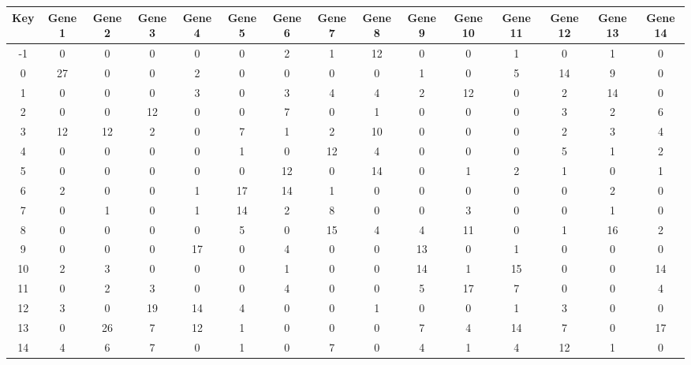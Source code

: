 \begin{tabular}{|c|c|c|c|c|c|c|c|c|c|c|c|c|c|c|}
\hline
Key & Gene 1 & Gene 2 & Gene 3 & Gene 4 & Gene 5 & Gene 6 & Gene 7 & Gene 8 & Gene 9 & Gene 10 & Gene 11 & Gene 12 & Gene 13 & Gene 14 \\
\hline
-1 & 0 & 0 & 0 & 0 & 0 & 2 & 1 & 12 & 0 & 0 & 1 & 0 & 1 & 0 \\
0 & 27 & 0 & 0 & 2 & 0 & 0 & 0 & 0 & 1 & 0 & 5 & 14 & 9 & 0 \\
1 & 0 & 0 & 0 & 3 & 0 & 3 & 4 & 4 & 2 & 12 & 0 & 2 & 14 & 0 \\
2 & 0 & 0 & 12 & 0 & 0 & 7 & 0 & 1 & 0 & 0 & 0 & 3 & 2 & 6 \\
3 & 12 & 12 & 2 & 0 & 7 & 1 & 2 & 10 & 0 & 0 & 0 & 2 & 3 & 4 \\
4 & 0 & 0 & 0 & 0 & 1 & 0 & 12 & 4 & 0 & 0 & 0 & 5 & 1 & 2 \\
5 & 0 & 0 & 0 & 0 & 0 & 12 & 0 & 14 & 0 & 1 & 2 & 1 & 0 & 1 \\
6 & 2 & 0 & 0 & 1 & 17 & 14 & 1 & 0 & 0 & 0 & 0 & 0 & 2 & 0 \\
7 & 0 & 1 & 0 & 1 & 14 & 2 & 8 & 0 & 0 & 3 & 0 & 0 & 1 & 0 \\
8 & 0 & 0 & 0 & 0 & 5 & 0 & 15 & 4 & 4 & 11 & 0 & 1 & 16 & 2 \\
9 & 0 & 0 & 0 & 17 & 0 & 4 & 0 & 0 & 13 & 0 & 1 & 0 & 0 & 0 \\
10 & 2 & 3 & 0 & 0 & 0 & 1 & 0 & 0 & 14 & 1 & 15 & 0 & 0 & 14 \\
11 & 0 & 2 & 3 & 0 & 0 & 4 & 0 & 0 & 5 & 17 & 7 & 0 & 0 & 4 \\
12 & 3 & 0 & 19 & 14 & 4 & 0 & 0 & 1 & 0 & 0 & 1 & 3 & 0 & 0 \\
13 & 0 & 26 & 7 & 12 & 1 & 0 & 0 & 0 & 7 & 4 & 14 & 7 & 0 & 17 \\
14 & 4 & 6 & 7 & 0 & 1 & 0 & 7 & 0 & 4 & 1 & 4 & 12 & 1 & 0 \\
\hline
\end{tabular}